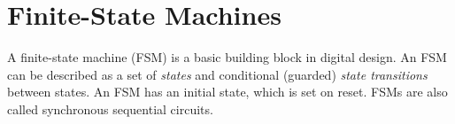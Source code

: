 \documentclass[%
    10pt,
    headinclude, footinclude=false,
    openright, %
    notitlepage,
    cleardoublepage=empty,
    headsepline,
    numbers=noenddot,
    bibliography=totoc, index=totoc,
    ]{scrbook}
\newcommand{\myref}[2]{\href{#1}{#2}}
\renewcommand{\myref}[2]{{#2}{\footnote{\url{#1}}}}
\begin{document}
%
%
%
%
%
%
%


\chapter{Finite-State Machines}

A finite-state machine (FSM) is a basic building block in digital design.
An FSM can be described as a set of \emph{states} and conditional (guarded)
\emph{state transitions} between states.
An FSM has an initial state, which is set on reset.
FSMs are also called synchronous sequential circuits.
\end{document}
